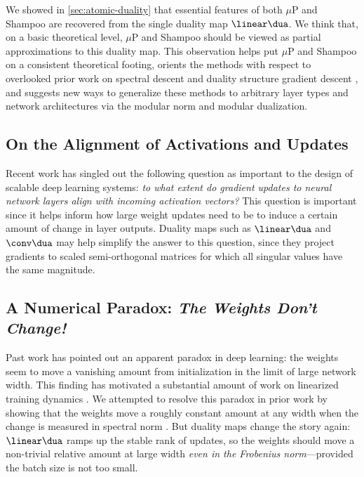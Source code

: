 We showed in \cref{sec:atomic-duality} that essential features of both $\mu$P and Shampoo are recovered from the single duality map $\linear\dua$. We think that, on a basic theoretical level, $\mu$P and Shampoo should be viewed as partial approximations to this duality map. This observation helps put $\mu$P and Shampoo on a consistent theoretical footing, orients the methods with respect to overlooked prior work on spectral descent \citep{spectral-descent-4} and duality structure gradient descent \citep{flynn2017duality}, and suggests new ways to generalize these methods to arbitrary layer types and network architectures via the modular norm and modular dualization.

\subsection{On the Alignment of Activations and Updates}

Recent work \citep{my-spectral,everett2024scaling,modula} has singled out the following question as important to the design of scalable deep learning systems: \textit{to what extent do gradient updates to neural network layers align with incoming activation vectors?} This question is important since it helps inform how large weight updates need to be to induce a certain amount of change in layer outputs. Duality maps such as $\linear\dua$ and $\conv\dua$ may help simplify the answer to this question, since they project gradients to scaled semi-orthogonal matrices for which all singular values have the same magnitude.


\subsection{A Numerical Paradox: \textit{The Weights Don't Change!}}

Past work \citep{NEURIPS2019_0d1a9651,math9182246} has pointed out an apparent paradox in deep learning: the weights seem to move a vanishing amount from initialization in the limit of large network width. This finding has motivated a substantial amount of work on linearized training dynamics \citep{NTKjacot}. We attempted to resolve this paradox in prior work by showing that the weights move a roughly constant amount at any width when the change is measured in spectral norm \citep{my-spectral}. But duality maps change the story again: $\linear\dua$ ramps up the stable rank of updates, so the weights should move a non-trivial relative amount at large width \textit{even in the Frobenius norm}---provided the batch size is not too small.

